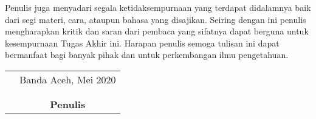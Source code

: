 \vspace{5cm}

Penulis juga menyadari segala ketidaksempurnaan yang terdapat didalamnya baik dari segi materi, cara, ataupun bahasa yang disajikan. Seiring dengan ini penulis mengharapkan kritik dan saran dari pembaca yang sifatnya dapat berguna untuk kesempurnaan Tugas Akhir ini. Harapan penulis semoga tulisan ini dapat bermanfaat bagi banyak pihak dan untuk perkembangan ilmu pengetahuan.

\vspace{0.5cm}


\begin{tabular}{p{7.5cm}c}
	&Banda Aceh, Mei 2020\\
	&\\
	&\\
	&\textbf{Penulis}
\end{tabular}